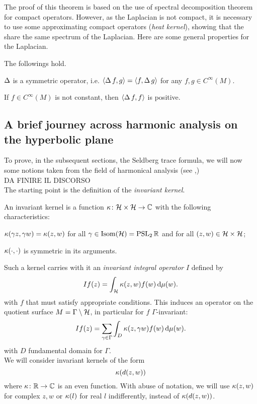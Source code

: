 The proof of this theorem is based on the use of spectral decomposition theorem for compact operators. However, as the Laplacian is not compact, it is necessary to use some approximating compact operators (\emph{heat kernel}), showing that the share the same spectrum of the Laplacian. Here are some general properties for the Laplacian.

\begin{nprop}
The followings hold.
\begin{compactitem}
\item $\operatorname{\Delta}$ is a symmetric operator, i.e. $\left< \operatorname{\Delta} f,g\right>=\left< f,\operatorname{\Delta} g\right>$ for any $f,g\in C^{\infty}(M)$.
\item If $f\in C^{\infty}(M)$ is not constant, then $\left< \operatorname{\Delta} f,f\right>$ is positive.
\end{compactitem}
\end{nprop}



\subsection{A brief journey across harmonic analysis on the hyperbolic plane}

\label{subsec:harmonic_analysis_hyperbolic}


To prove, in the subsequent sections, the Seldberg trace formula, we will now some notions taken from the field of harmonical analysis (see \cite{Evans:book},\cite{Horm:book1})\\

DA FINIRE IL DISCORSO\\

The starting point is the definition of the \emph{invariant kernel}.

\begin{defin}
\label{def:invariant_kernel}
An invariant kernel is a function $\kappa\colon\mathcal{H}\times\mathcal{H}\to\mathbb{C}$ with the following characteristics:
\begin{compactenum}
\item $\kappa(\gamma z,\gamma w)=\kappa(z,w)$ for all $\gamma\in\mathrm{Isom}(\mathcal{H})=\operatorname{PSL}_{2}\mathbb{R}$ and for all $(z,w)\in\mathcal{H}\times\mathcal{H}$;
\item $\kappa(\cdot,\cdot)$ is symmetric in its arguments.
\end{compactenum}
\end{defin}

Such a kernel carries with it an \emph{invariant integral operator} $I$ defined by
\[
If(z)=\int_{\mathcal{H}}\kappa(z,w)f(w)\mathop{}\!\mathrm{d}\mu(w).
\]
with $f$ that must satisfy appropriate conditions. This induces an operator on the quotient surface $M=\Gamma\setminus\mathcal{H}$, in particular for $f$ $\Gamma$-invariant:
\[
If(z)=\sum_{\gamma\in\Gamma}\int_{D}\kappa(z,\gamma w)f(w)\mathop{}\!\mathrm{d}\mu(w).
\]
with $D$ fundamental domain for $\Gamma$.\\
We will consider invariant kernels of the form 
\[
\kappa(d(z,w))
\]
where $\kappa\colon\mathbb{R}\to\mathbb{C}$ is an even function. With abuse of notation, we will use $\kappa(z,w)$ for complex $z,w$ or $\kappa(l)$ for real $l$ indifferently, instead of $\kappa(d(z,w))$.

